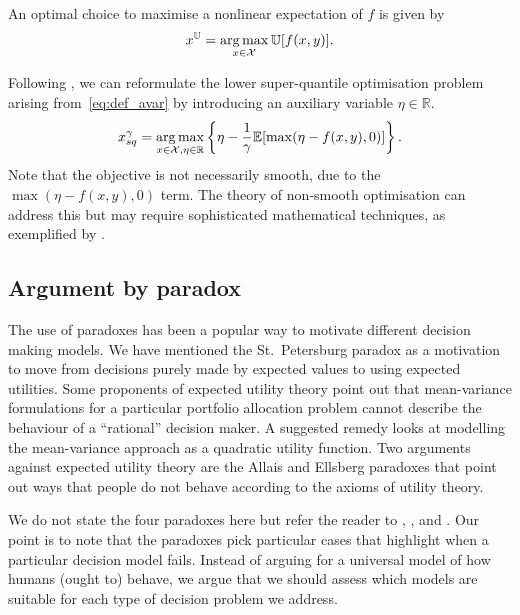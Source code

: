 \documentclass[main.tex]{subfiles}
\begin{document}
\begin{problem}
  An  optimal choice to maximise a nonlinear expectation
  of $f$ is given by
  \begin{align}
    x^{\mathbb{U}}=\operatorname*{arg\,max}_{x\in\mathcal{X}} \mathbb{U}[f(x,y)].
  \end{align}
\end{problem}

\begin{example}
  Following \citet{ben2007old}, we can reformulate the lower
  super-quantile optimisation problem arising from~\eqref{eq:def_avar}
  by introducing an auxiliary variable $\eta\in\mathbb{R}$.
  \begin{equation}\label{eq:opt_avar}
    x_{sq}^{\gamma}
    =\operatorname*{arg\,max}_{x\in\mathcal{X},\eta\in\mathbb{R}}
    \left\{\eta - \frac{1}{\gamma}\mathbb{E}[\max(\eta-f(x,y),0)]\right\}.
  \end{equation}
  Note that the objective is not necessarily smooth, due to the
  $\max(\eta-f(x,y),0)$ term. The theory of non-smooth optimisation
  can address this but may require sophisticated mathematical techniques, as
  exemplified by \citet{kouri2016risk}.
\end{example}


\subsection{Argument by paradox}
The use of paradoxes has been a popular way to motivate different
decision making models. We have mentioned the St.~Petersburg paradox
as a motivation to move from decisions purely made by expected values
to using expected utilities.  Some proponents of expected utility
theory point out that mean-variance formulations for a particular
portfolio allocation problem cannot describe the behaviour of a
``rational'' decision maker. A suggested remedy looks at modelling the
mean-variance approach as a quadratic utility function.  Two arguments
against expected utility theory are the Allais and Ellsberg paradoxes
that point out ways that people do not behave according to the axioms
of utility theory.

We do not state the four paradoxes here but refer the reader to
\citet{ellsberg1961risk}, \citet{follmer2004stochastic}, and
\citet{johnstone2013mean}.  Our point is to note that the
paradoxes pick particular cases that highlight when a particular
decision model fails. Instead of arguing for a universal model of how
humans (ought to) behave, we argue that we should assess which models
are suitable for each type of decision problem we address.
\end{document}

